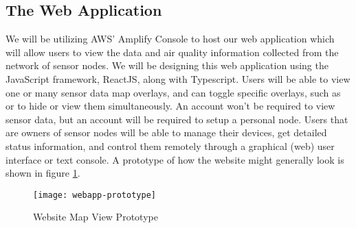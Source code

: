 \subsection{The Web Application}
We will be utilizing AWS' Amplify Console to host our web application which will allow users to view
the data and air quality information collected from the network of sensor nodes. We will be
designing this web application using the JavaScript framework, ReactJS, along with Typescript. Users
will be able to view one or many sensor data map overlays, and can toggle specific overlays, such as
\sdo or \ndo to hide or view them simultaneously. An account won't be required to view sensor data,
but an account will be required to setup a personal node. Users that are owners of sensor nodes will
be able to manage their devices, get detailed status information, and control them remotely through
a graphical (web) user interface or text console. A prototype of how the website might generally
look is shown in figure \ref{fig:website-prototype-map}. 

\begin{figure}
    \centering
    \texttt{[image: webapp-prototype]}
    \caption{Website Map View Prototype}
    \label{fig:website-prototype-map} 
\end{figure}
